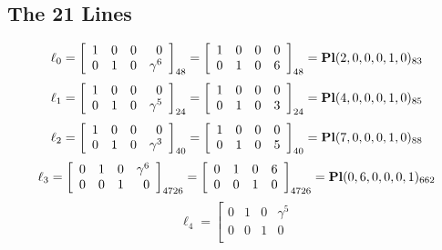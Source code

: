 \documentclass{article}
\begin{document}
{\subsection*{The 21 Lines}
$$
\ell_{0} = 
\left[
\begin{array}{*{4}{r}}
1 & 0 & 0 & 0\\
0 & 1 & 0 & \gamma^{6}\\
\end{array}
\right]
_{48}
=
\left[
\begin{array}{*{4}c}
1  & 0  & 0  & 0\\
0  & 1  & 0  & 6\\
\end{array}
\right]_{48}
={\rm\bf Pl}(2,0,0,0,1,0 )_{83}$$
$$
\ell_{1} = 
\left[
\begin{array}{*{4}{r}}
1 & 0 & 0 & 0\\
0 & 1 & 0 & \gamma^{5}\\
\end{array}
\right]
_{24}
=
\left[
\begin{array}{*{4}c}
1  & 0  & 0  & 0\\
0  & 1  & 0  & 3\\
\end{array}
\right]_{24}
={\rm\bf Pl}(4,0,0,0,1,0 )_{85}$$
$$
\ell_{2} = 
\left[
\begin{array}{*{4}{r}}
1 & 0 & 0 & 0\\
0 & 1 & 0 & \gamma^{3}\\
\end{array}
\right]
_{40}
=
\left[
\begin{array}{*{4}c}
1  & 0  & 0  & 0\\
0  & 1  & 0  & 5\\
\end{array}
\right]_{40}
={\rm\bf Pl}(7,0,0,0,1,0 )_{88}$$
$$
\ell_{3} = 
\left[
\begin{array}{*{4}{r}}
0 & 1 & 0 & \gamma^{6}\\
0 & 0 & 1 & 0\\
\end{array}
\right]
_{4726}
=
\left[
\begin{array}{*{4}c}
0  & 1  & 0  & 6\\
0  & 0  & 1  & 0\\
\end{array}
\right]_{4726}
={\rm\bf Pl}(0,6,0,0,0,1 )_{662}$$
$$
\ell_{4} = 
\left[
\begin{array}{*{4}{r}}
0 & 1 & 0 & \gamma^{5}\\
0 & 0 & 1 & 0\\

\end{array}$$}
\end{document}
